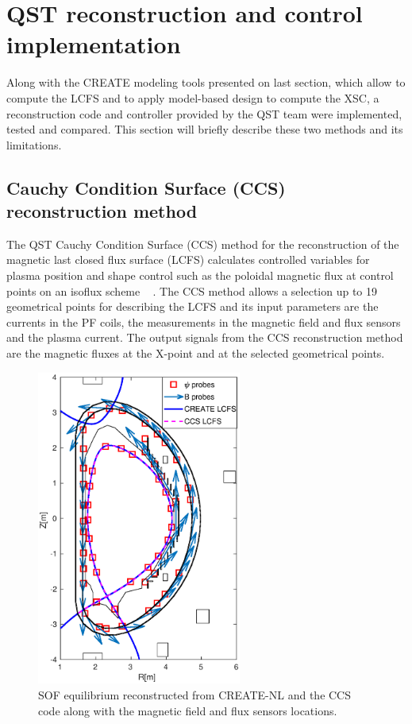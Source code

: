 \section{QST reconstruction and control implementation}
Along with the CREATE modeling tools presented on last section, which allow to compute the LCFS and to apply model-based design to compute the XSC, a reconstruction code and controller provided by the QST team were implemented, tested and compared. This section will briefly describe these two methods and its limitations.  

\subsection{Cauchy Condition Surface (CCS) reconstruction  method }
The QST Cauchy Condition Surface (CCS) method for the reconstruction of the magnetic last closed flux surface (LCFS) calculates controlled variables for plasma position and shape control such as the poloidal magnetic flux at control points on an isoflux scheme  ~\cite{CCS} . The CCS method allows a selection up to 19 geometrical points for describing the LCFS and its input parameters are the currents in the PF coils, the measurements in the magnetic field and flux sensors and the plasma current. The output signals from the CCS reconstruction method are the magnetic fluxes at the X-point and at the selected geometrical points. 

\begin{figure}
	\centering
	\includegraphics[width=0.6\textwidth]{Chp3/sensors_plots_newDirection.eps}
	\caption{SOF equilibrium reconstructed from CREATE-NL and the CCS code along with the  magnetic field and flux sensors locations.	\label{JT60sensors} }
\end{figure}


